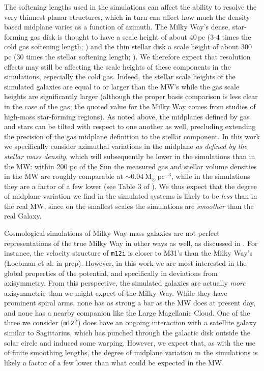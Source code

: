 \documentclass[twocolumn]{aastex62}
\newcommand{\Msun}{\ensuremath{\text{M}_\odot}}
\newcommand{\pc}{\text{pc}}
\newcommand{\unit}[2]{\ensuremath{\textrm{#1}^{\mathrm{#2}}}}
\newcommand{\mi}{\texttt{m12i}}
\newcommand{\mf}{\texttt{m12f}}
\begin{document}
The softening lengths used in the simulations can affect the ability to
resolve the very thinnest planar structures, which in turn can affect how much
the density-based midplane varies as a function of azimuth. The Milky Way's
dense, star-forming gas disk is thought to have a scale height of about
$40\,\pc$ ($3\text{-}4$ times the cold gas softening length;
\citealt{2019ApJ...871..145A}) and the thin stellar disk a scale height of
about 300 pc (30 times the stellar softening length;
\citealt{2008ApJ...673..864J}). We therefore expect that resolution effects
may still be affecting the scale heights of these components in the
simulations, especially the cold gas. Indeed, the stellar scale heights of the
simulated galaxies are equal to or larger than the MW's while the gas scale
heights are significantly larger (although the proper basis comparison is less
clear in the case of the gas; the quoted value for the Milky Way comes from
studies of high-mass star-forming regions). As noted above, the midplanes
defined by gas and stars can be tilted with respect to one another as well,
precluding extending the precision of the gas midplane definition to the
stellar component. In this work we specifically consider azimuthal variations
in the midplane \emph{as defined by the stellar mass density}, which will
subsequently be lower in the simulations than in the MW: within 200 pc of the
Sun the measured gas and stellar volume densities in the MW are roughly
comparable at $\sim 0.04\ \Msun\
\unit{pc}{-3}$, while in the simulations they are a factor of a few lower (see
Table 3 of \citealt{2018arXiv180610564S}). We thus expect that the degree of
midplane variation we find in the simulated systems is likely to be
\emph{less} than in the real MW, since on the smallest scales the simulations
are \emph{smoother} than the real Galaxy.


Cosmological simulations of Milky Way-mass galaxies are not perfect
representations of the true Milky Way in other ways as well, as discussed in
\citet{2018arXiv180610564S}. For instance, the velocity structure of \mi{} is
closer to M31's than the Milky Way's (Loebman et al. in prep). However, in
this work we are most interested in the global properties of the potential,
and specifically in deviations from axisymmetry. From this perspective, the
simulated galaxies are actually \emph{more} axisymmetric than we might expect
of the Milky Way. While they have prominent spiral arms, none has as strong a
bar as the MW does at present day, and none has a nearby companion like the
Large Magellanic Cloud. One of the three we consider (\mf) does have an
ongoing interaction with a satellite galaxy similar to Sagittarius, which has
punched through the galactic disk outside the solar circle and induced some
warping. However, we expect that, as with the use of finite smoothing lengths,
the degree of midplane variation in the simulations is likely a factor of a
few lower than what could be expected in the MW.
\end{document}
